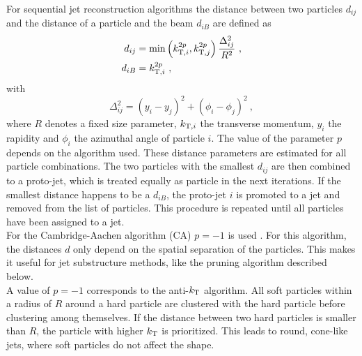 \noindent For sequential jet reconstruction algorithms the distance between two particles $d_{ij}$ and the distance of a particle and the beam $d_{iB}$ are defined as
\begin{align}
d_{ij} &= \min\left(k_{{\rm T},i}^{2p},k_{{\rm T},j}^{2p}\right)\frac{\Delta_{ij}^2}{R^2} ~, \\
d_{iB} &= k_{{\rm T},i}^{2p} ~,
\end{align}
with
\begin{equation}
\Delta_{ij}^2 = (y_i-y_j)^2 + (\phi_i - \phi_j)^2 ~, \label{eq:reco:deltar}
\end{equation}
where $R$ denotes a fixed size parameter, $k_{{\rm T},i}$ the transverse momentum, $y_i$ the rapidity and $\phi_i$ the azimuthal angle of particle $i$. The value of the parameter $p$ depends on the algorithm used. These distance parameters are estimated for all particle combinations. The two particles with the smallest $d_{ij}$ are then combined to a proto-jet, which is treated equally as particle in the next iterations. If the smallest distance happens to be a $d_{iB}$, the proto-jet $i$ is promoted to a jet and removed from the list of particles. This procedure is repeated until all particles have been assigned to a jet.\\

\noindent For the Cambridge-Aachen algorithm (CA) $p=-1$ is used \cite{CA}. For this algorithm, the distances $d$ only depend on the spatial separation of the particles. This makes it useful for jet substructure methods, like the pruning algorithm described below.\\

\noindent A value of $p=-1$ corresponds to the anti-$k_{\rm T}$ algorithm. All soft particles within a radius of $R$ around a hard particle are clustered with the hard particle before clustering among themselves. If the distance between two hard particles is smaller than $R$, the particle with higher $k_{\rm T}$ is prioritized. This leads to round, cone-like jets, where soft particles do not affect the shape.\\


